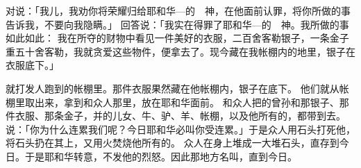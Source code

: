 {对{}说：「我儿，我劝你将荣耀归给耶和华—{}的　神，在他面前认罪，将你所做的事告诉我，不要向我隐瞒。」
回答{}说：「我实在得罪了耶和华—{}的　神。我所做的事如此如此：
我在所夺的财物中看见一件美好的{}衣服，二百舍客勒银子，一条金子重五十舍客勒，我就贪爱这些物件，便拿去了。现今藏在我帐棚内的地里，银子在衣服底下。」
\par }{\PP {}就打发人跑到{}的帐棚里。那件衣服果然藏在他帐棚内，银子在底下。
他们就从帐棚里取出来，拿到{}和{}众人那里，放在耶和华面前。
和{}众人把{}的曾孙{}和那银子、那件衣服、那条金子，并{}的儿女、牛、驴、羊、帐棚，以及他所有的，都带到{}去。
说：「你为什么连累我们呢？今日耶和华必叫你受连累。」于是{}众人用石头打死他，将石头扔在其上，又用火焚烧他所有的。
众人在{}身上堆成一大堆石头，直存到今日。于是耶和华转意，不发他的烈怒。因此那地方名叫{}，直到今日。

}
